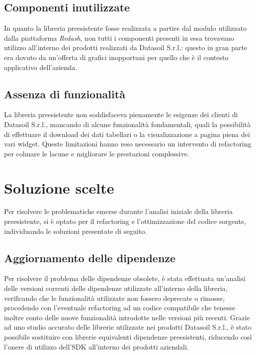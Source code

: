 \subsection{Componenti inutilizzate}
In quanto la libreria preesistente fosse realizzata a partire dal modulo utilizzato dalla piattaforma \textit{Redash}, non tutti i componenti presenti
in essa trovavano utilizzo all'interno dei prodotti realizzati da Datasoil S.r.l.: questo in gran parte era dovuto da un'offerta di grafici inopportuni
per quello che è il contesto applicativo dell'azienda.

\subsection{Assenza di funzionalità}
La libreria preesistente non soddisfaceva pienamente le esigenze dei clienti di Datasoil S.r.l., mancando di alcune funzionalità fondamentali,
quali la possibilità di effettuare il download dei dati tabellari o la visualizzazione a pagina piena dei vari widget.
Queste limitazioni hanno reso necessario un intervento di refactoring per colmare le lacune e migliorare le prestazioni complessive.

\section{Soluzione scelte}
Per risolvere le problematiche emerse durante l'analisi iniziale della libreria preesistente, si è optato per il refactoring e l'ottimizzazione
del codice sorgente, individuando le soluzioni presentate di seguito.

\subsection{Aggiornamento delle dipendenze}
Per risolvere il problema delle dipendenze obsolete, è stata effettuata un'analisi delle versioni correnti delle dipendenze utilizzate all'interno della libreria,
verificando che le funzionalità utilizzate non fossero deprecate o rimosse, procedendo con l'eventuale refactoring ad un codice compatibile che tenesse inoltre conto
delle nuove funzionalità introdotte nelle versioni più recenti. \newline
Grazie ad uno studio accurato delle librerie utilizzate nei prodotti Datasoil S.r.l., è stato possibile sostituire con librerie equivalenti dipendenze preesistenti,
riducendo così l'onere di utilizzo dell'SDK all'interno dei prodotti aziendali.

